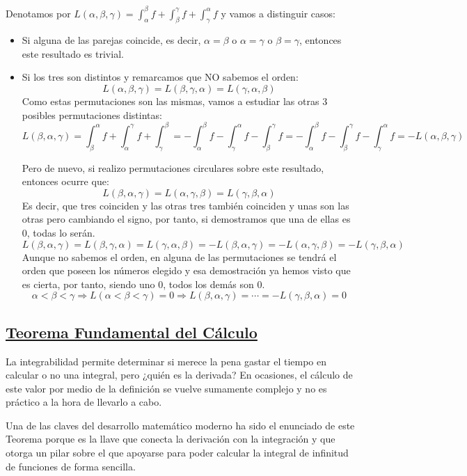 \documentclass[10pt,a4paper,openright]{book}
\begin{document}
Denotamos por $L(\alpha,\beta,\gamma) = \int_{\alpha}^{\beta} f+ \int_{\beta}^{\gamma} f + \int_{\gamma}^{\alpha} f$ y vamos a distinguir casos:
\begin{itemize}
\item Si alguna de las parejas coincide, es decir, $\alpha = \beta$ o $\alpha = \gamma$ o $\beta = \gamma$, entonces este resultado es trivial.

\item Si los tres son distintos y remarcamos que NO sabemos el orden:
$$L(\alpha , \beta , \gamma) = L(\beta , \gamma , \alpha) = L(\gamma , \alpha , \beta)$$
Como estas permutaciones son las mismas, vamos a estudiar las otras 3 posibles permutaciones distintas:
$$L(\beta , \alpha , \gamma) = \int^\alpha_\beta f + \int^\gamma_\alpha f +  \int^\beta_\gamma = - \int^\beta_\alpha f - \int^\alpha_\gamma f - \int^\gamma_\beta f = - \int^\beta_\alpha f - \int^\gamma_\beta f - \int^\alpha_\gamma f   =  -L(\alpha , \beta , \gamma)$$

Pero de nuevo, si realizo permutaciones circulares sobre este resultado, entonces ocurre que:
$$L(\beta , \alpha , \gamma) = L(\alpha , \gamma , \beta) = L(\gamma , \beta , \alpha) $$
Es decir, que tres coinciden y las otras tres también coinciden y unas son las otras pero cambiando el signo, por tanto, si demostramos que una de ellas es 0, todas lo serán.
$$L(\beta , \alpha , \gamma) = L(\beta , \gamma , \alpha) = L(\gamma , \alpha , \beta) = - L(\beta , \alpha , \gamma) = - L(\alpha , \gamma , \beta) = - L(\gamma , \beta , \alpha) $$
Aunque no sabemos el orden, en alguna de las permutaciones se tendrá el orden que poseen los números elegido y esa demostración ya hemos visto que es cierta, por tanto, siendo uno 0, todos los demás son 0.
$$\alpha < \beta < \gamma \Rightarrow L(\alpha < \beta < \gamma ) = 0\Rightarrow L(\beta , \alpha , \gamma) = \cdots  = - L(\gamma , \beta , \alpha) = 0$$
\end{itemize}

\subsection*{\underline{Teorema Fundamental del Cálculo}}
La integrabilidad permite determinar si merece la pena gastar el tiempo en calcular o no una integral, pero ¿quién es la derivada? En ocasiones, el cálculo de este valor por medio de la definición se vuelve sumamente complejo y no es práctico a la hora de llevarlo a cabo.

Una de las claves del desarrollo matemático moderno ha sido el enunciado de este Teorema porque es la llave que conecta la derivación con la integración y que otorga un pilar sobre el que apoyarse para poder calcular la integral de infinitud de funciones de forma sencilla.
\end{document}
